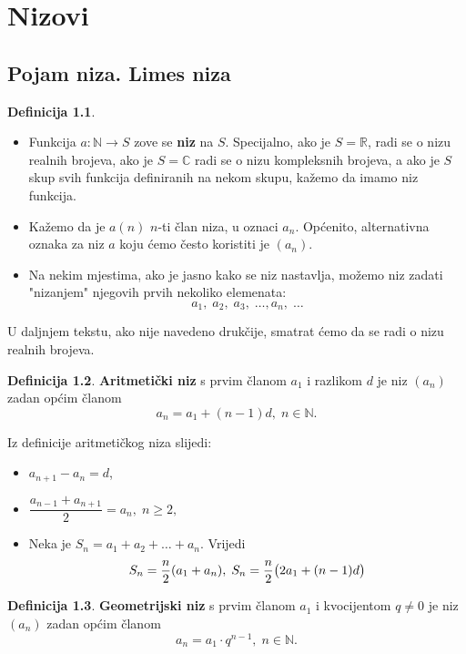 \documentclass{book}
\let\originalleft\left
\let\originalright\right
\renewcommand{\left}{\mathopen{}\mathclose\bgroup\originalleft}
\renewcommand{\right}{\aftergroup\egroup\originalright}
\theoremstyle{definition}
\theoremstyle{definition}
\newtheorem{definition}{Definicija}
\theoremstyle{remark}
\begin{document}
\chapter{Nizovi}
\fancyhead[RO, RE]{}
\section{Pojam niza. Limes niza}
\begin{definition} \textbf{}
\begin{itemize}
\item Funkcija $a : \mathbb{N}\to S$ zove se \textbf{niz} na $S$. Specijalno, ako je $S=\mathbb{R}$, radi se o nizu realnih brojeva, ako je $S=\mathbb{C}$ radi se o nizu kompleksnih brojeva, a ako je $S$ skup svih funkcija definiranih na nekom skupu, kažemo da imamo niz funkcija.

\item Kažemo da je $a(n)$ $n$-ti član niza, u oznaci $a_n$. Općenito, alternativna oznaka za niz $a$ koju ćemo često koristiti je $(a_n)$. 

\item Na nekim mjestima, ako je jasno kako se niz nastavlja, možemo niz zadati "nizanjem" njegovih prvih nekoliko elemenata:
$$a_1,\; a_2,\; a_3,\;\dots, a_n,\; \dots $$
\end{itemize}
\end{definition}
U daljnjem tekstu, ako nije navedeno drukčije, smatrat ćemo da se radi o nizu realnih brojeva.
\begin{definition}
\textbf{Aritmetički niz} s prvim članom $a_1$ i razlikom $d$ je niz $(a_n)$ zadan općim članom
$$a_n=a_1+(n-1)d, \; n\in \mathbb{N}.$$
\end{definition}

\noindent Iz definicije aritmetičkog niza slijedi:
\begin{itemize}
\item $a_{n+1}-a_n=d$,
\item $\dfrac{a_{n-1}+a_{n+1}}{2}=a_n, \; n\geq 2,$
\item Neka je $S_n=a_1+a_2+\dots+a_n$. Vrijedi
\begin{gather}
\label{arsum}
S_n=\dfrac{n}{2}\left(a_1+a_n\right), \; S_n=\dfrac{n}{2}\left(2a_1+(n-1)d\right)
\end{gather}
\end{itemize}
\begin{definition}
\label{17}
\textbf{Geometrijski niz} s prvim članom $a_1$ i kvocijentom $q\neq 0$ je niz $(a_n)$ zadan općim članom
$$a_n=a_1\cdot q^{n-1}, \; n\in \mathbb{N}.$$
\end{definition}
\end{document}
